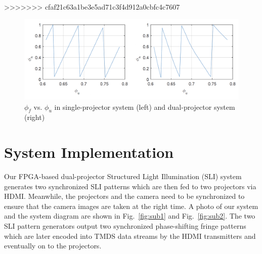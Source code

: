 \documentclass[]{spie}  %
\begin{document}
>>>>>>> cfaf21c63a1be3e5ad71c3f4d912a0cbfc4c7607
\begin{figure}[!t]
  \includegraphics[width=\linewidth]{phase.png}
  \caption{$\phi_f$ vs. $\phi_u$ in single-projector system (left) and dual-projector system (right)}
  \label{Fig:3}
\end{figure}




















\section{System Implementation}
Our FPGA-based dual-projector Structured Light Illumination (SLI) system generates two synchronized SLI patterns which are then fed to two projectors via HDMI. Meanwhile, the projectors and the camera need to be synchronized to ensure that the camera images are taken at the right time. A photo of our system and the system diagram are shown in Fig.~\ref{fig:sub1} and Fig.~\ref{fig:sub2}. The two SLI pattern generators output two synchronized phase-shifting fringe patterns which are later encoded into TMDS data streams by the HDMI transmitters and eventually on to the projectors. 

\end{document}
